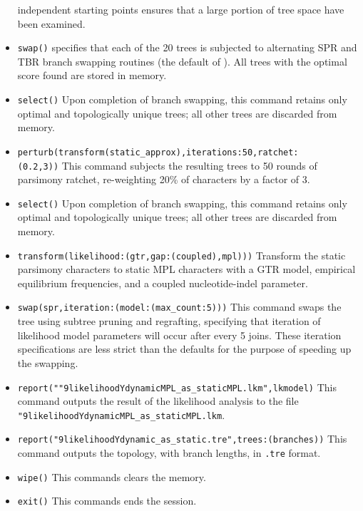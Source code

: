 \begin{itemize}
independent starting points ensures that a large portion of tree space have been examined.
\item \texttt{swap()}  specifies that each of the 20 trees is subjected to alternating SPR and 
TBR branch swapping routines (the default of \poy). All trees with the optimal score found are stored in memory.
\item \texttt{select()} Upon completion of branch swapping, this command retains only optimal and topologically 
unique trees; all other trees are discarded from memory. 
\item \texttt{perturb(transform(static\_approx),iterations:50,ratchet:\\(0.2,3))} This command subjects the resulting 
trees to 50 rounds of parsimony ratchet, re-weighting 20\% of characters by a factor of 3.
\item \texttt{select()} Upon completion of branch swapping, this command retains only optimal and topologically 
unique trees; all other trees are discarded from memory. 
\item \texttt{transform(likelihood:(gtr,gap:(coupled),mpl)))} Transform the static parsimony characters to static 
MPL characters with a GTR model, empirical equilibrium frequencies, and a coupled nucleotide-indel 
parameter.
\item \texttt{swap(spr,iteration:(model:(max\_count:5)))} This command swaps the tree using subtree pruning and 
regrafting, specifying that iteration of likelihood model parameters will occur after every 5 joins. These iteration 
specifications are less strict than the defaults for the purpose of speeding up the swapping.
\item \texttt{report(""9likelihoodYdynamicMPL\_as\_staticMPL.lkm",lkmodel)} This command outputs the result of 
the likelihood analysis to the file \texttt{"9likelihoodYdynamicMPL\_as\_staticMPL.lkm}.
\item \texttt{report("9likelihoodYdynamic\_as\_static.tre",trees:(branches))} This command outputs the topology, 
with branch lengths, in \texttt{.tre} format.
\item \texttt{wipe()} This commands clears the memory.
\item \texttt{exit()} This commands ends the \poy session.
\end{itemize}

